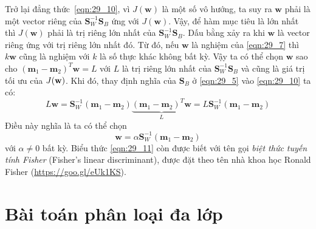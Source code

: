 Trở lại đẳng thức~\eqref{eqn:29_10}, vì $J(\mathbf{w})$ là một số vô
hướng, ta suy ra $\mathbf{w}$ phải là một vector riêng của
$\mathbf{S}_W^{-1}\mathbf{S}_B$ ứng với $J(\mathbf{w})$. Vậy, để hàm mục tiêu là
lớn nhất thì $J(\mathbf{w})$ phải là trị riêng lớn nhất của
$\mathbf{S}_W^{-1}\mathbf{S}_B$. Dấu bằng xảy ra khi $\mathbf{w}$ là vector
riêng ứng với trị riêng lớn nhất đó.
Từ đó, nếu $\mathbf{w}$ là nghiệm của \eqref{eqn:29_7} thì
$k\mathbf{w}$ cũng là nghiệm với $k$ là số thực khác không bất kỳ. Vậy ta có thể
chọn $\mathbf{w}$ sao cho $(\mathbf{m}_1 - \mathbf{m}_2)^T\mathbf{w} =  L$ với
$L$ là trị riêng lớn nhất của $\mathbf{S}_W^{-1}\mathbf{S}_B$ và cũng là giá
trị tối ưu của $J(\mathbf{w})$. Khi đó, thay định nghĩa của $\mathbf{S}_B$ ở
\eqref{eqn:29_5} vào \eqref{eqn:29_10} ta có:
\begin{equation}
L \mathbf{w} = \mathbf{S}_{W}^{-1}(\mathbf{m}_1 - \mathbf{m}_2)\underbrace{(\mathbf{m}_1 - \mathbf{m}_2)^T\mathbf{w}}_L =  L\mathbf{S}_{W}^{-1}(\mathbf{m}_1 - \mathbf{m}_2)
\end{equation}
Điều này nghĩa là ta có thể chọn
\begin{equation}
\label{eqn:29_11}
\mathbf{w} = \alpha\mathbf{S}_{W}^{-1}(\mathbf{m}_1 - \mathbf{m}_2)
\end{equation}
với $\alpha \neq 0$ bất kỳ. Biểu thức \eqref{eqn:29_11} còn được biết với tên gọi \textit{biệt thức tuyến tính Fisher}
({Fisher's linear discriminant}), được đặt theo tên nhà khoa học Ronald
Fisher (\url{https://goo.gl/eUk1KS}).


\section{Bài toán phân loại đa lớp}
\label{sec:29_3}

